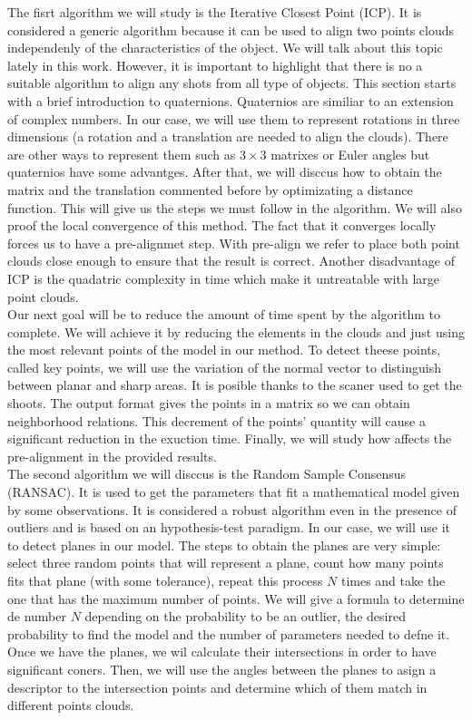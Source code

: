 The fisrt algorithm we will study is the Iterative Closest Point (ICP). It is considered a generic algorithm because it can be used to align two points clouds independenly of the characteristics of the object. We will talk about this topic lately in this work. However, it is important to highlight that there is no a suitable algorithm to align any shots from all type of objects. This section starts with a brief introduction to quaternions. Quaternios are similiar to an extension of complex numbers. In our case, we will use them to represent rotations in three dimensions (a rotation and a translation are needed to align the clouds). There are other  ways to represent them such as $ 3 \times 3$ matrixes or Euler angles but quaternios have some advantges. After that, we will disccus how to obtain the matrix and the translation commented before by optimizating a distance function. This will give us the steps we must follow in the algorithm. We will also proof the local convergence of this method. The fact that it converges locally forces us to have a pre-alignmet step. With pre-align we refer to place both point clouds close enough  to ensure that the result is correct. Another disadvantage of ICP is the quadatric complexity in time which make it untreatable with large point clouds. \\

Our next goal will be to reduce the amount of time spent by the algorithm to complete. We will achieve it by reducing the elements in the clouds and just using the most relevant points of the model in our method. To detect theese points, called key points, we will use the variation of the normal vector to distinguish between planar and sharp areas. It is posible thanks to the scaner used to get the shoots. The output format gives the points in a matrix so we can obtain neighborhood relations. This decrement of the points' quantity will cause a significant reduction in the exuction time. Finally, we will study how affects the pre-alignment in the provided results.  \\

The second algorithm we will disccus is the Random Sample Consensus (RANSAC). It is used to get the parameters that fit a mathematical model given by some observations. It is considered a robust algorithm even in the presence of outliers and is based on an hypothesis-test paradigm. In our case, we will use it to detect planes in our model. The steps to obtain the planes are very simple: select three random points that will represent a plane, count how many points fits that plane (with some tolerance), repeat this process $ N $ times and take the one that has the maximum number of points. We will give a formula to determine de number $ N $ depending on the probability to be an outlier, the desired probability to find the model and the number of parameters needed to defne it. Once we have the planes, we wil calculate their intersections in order to have significant coners. Then, we will use the angles between the planes to asign a descriptor to the intersection points and determine which of them match in different points clouds.\\

